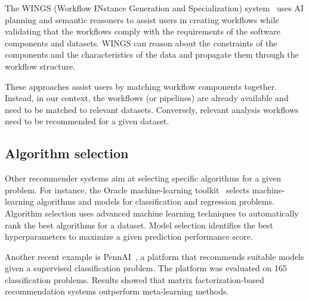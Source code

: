 
The WINGS (Workflow INstance Generation and Specialization) system~\cite{gil2010wings} uses AI planning and semantic reasoners to assist users in creating workflows while validating that the workflows comply with the requirements of the software components and datasets. WINGS can reason about the constraints of the components and the characteristics of the data and propagate them through the workflow structure.

These approaches assist users by matching workflow components together. Instead, in our context, the workflows (or pipelines) are already available and need to be matched to relevant datasets. Conversely, relevant analysis workflows need to be recommended for a given dataset.

\subsection{Algorithm selection}

Other recommender systems aim at selecting specific algorithms for a given problem. For instance, the Oracle machine-learning toolkit~\cite{oracle} selects machine-learning algorithms and models for classiﬁcation and regression problems. Algorithm selection uses advanced machine learning techniques to automatically rank the best algorithms for a dataset. Model selection identifies the best hyperparameters to maximize a given prediction performance score. 

Another recent example is PennAI~\cite{la2021evaluating}, a platform that recommends suitable models given a supervised classification problem. The platform was evaluated on 165 classification problems. Results showed that matrix factorization-based recommendation systems outperform meta-learning methods.

